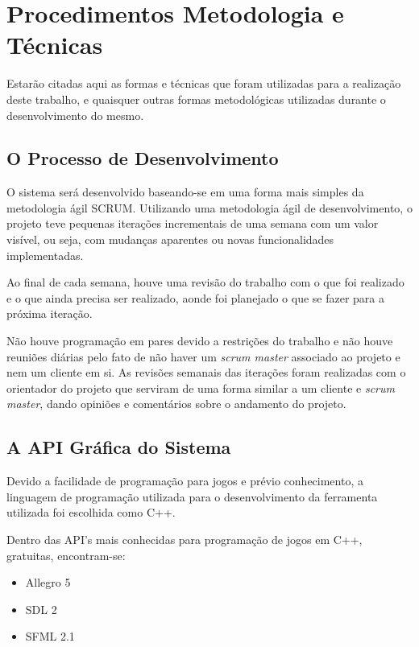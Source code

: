 \chapter[Procedimentos Metodológicos e Técnicas]{Procedimentos Metodologia e Técnicas}

Estarão citadas aqui as formas e técnicas que foram utilizadas para a realização deste trabalho, e quaisquer outras formas metodológicas utilizadas durante o desenvolvimento do mesmo. 

\section{O Processo de Desenvolvimento}

O sistema será desenvolvido baseando-se em uma forma mais simples da metodologia ágil SCRUM. Utilizando uma metodologia ágil de desenvolvimento, o projeto teve pequenas iterações incrementais de uma semana com um valor visível, ou seja, com mudanças aparentes ou novas funcionalidades implementadas. 

Ao final de cada semana, houve uma revisão do trabalho com o que foi realizado e o que ainda precisa ser realizado, aonde foi planejado o que se fazer para a próxima iteração. 

Não houve programação em pares devido a restrições do trabalho e não houve reuniões diárias pelo fato de não haver um \textit{scrum master} associado ao projeto e nem um cliente em si. As revisões semanais das iterações foram realizadas com o orientador do projeto que serviram de uma forma similar a um cliente e \textit{scrum master}, dando opiniões e comentários sobre o andamento do projeto.

\section{A API Gráfica do Sistema}

Devido a facilidade de programação para jogos e prévio conhecimento, a linguagem de programação utilizada para o desenvolvimento da ferramenta utilizada foi escolhida como C++. 

Dentro das API's mais conhecidas para programação de jogos em C++, gratuitas, encontram-se: 
\begin{itemize}
	\item Allegro 5 
	\item SDL 2
	\item SFML 2.1
\end{itemize}

